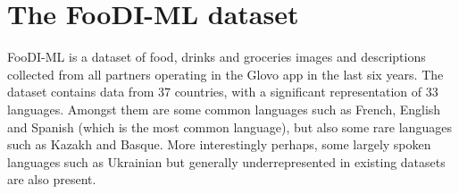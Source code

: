 \documentclass[10pt,twocolumn,letterpaper]{article}
\begin{document}
\begin{table}
  \vspace{1mm}
  \centering
    \caption{Table showing the different visio-linguistic datasets. We choose to follow a similar format as \cite{srinivasan2021wit} for consistency. Note that our dataset is the second richest dataset in terms of text samples and languages. In this table, we quote the number of non-unique images.}
  \label{tab:table1}
\end{table}










\section{The FooDI-ML dataset}
\label{sec:the_dataset}
FooDI-ML is a dataset of food, drinks and groceries images and descriptions collected from all partners operating in the Glovo app in the last six years. The dataset contains data from 37 countries, with a significant representation of 33 languages. Amongst them are some common languages such as French, English and Spanish (which is the most common language), but also some rare languages such as Kazakh and Basque. More interestingly perhaps, some largely spoken languages such as Ukrainian but generally underrepresented in existing datasets are also present.
\end{document}
